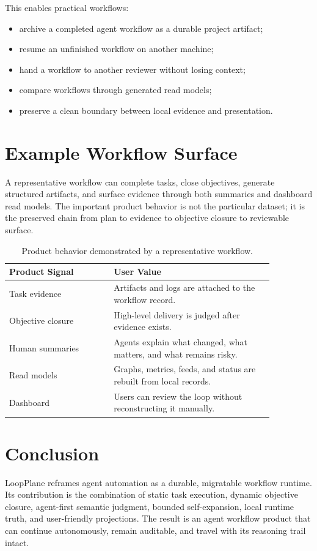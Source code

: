 \documentclass[11pt]{article}
\begin{document}
This enables practical workflows:

\begin{itemize}
\item archive a completed agent workflow as a durable project artifact;
\item resume an unfinished workflow on another machine;
\item hand a workflow to another reviewer without losing context;
\item compare workflows through generated read models;
\item preserve a clean boundary between local evidence and presentation.
\end{itemize}

\section{Example Workflow Surface}

A representative workflow can complete tasks, close objectives, generate
structured artifacts, and surface evidence through both summaries and dashboard
read models. The important product behavior is not the particular dataset; it
is the preserved chain from plan to evidence to objective closure to reviewable
surface.

\begin{table}[H]
\centering
\begin{tabular}{p{0.34\linewidth}p{0.52\linewidth}}
\toprule
Product Signal & User Value \\
\midrule
Task evidence & Artifacts and logs are attached to the workflow record. \\
Objective closure & High-level delivery is judged after evidence exists. \\
Human summaries & Agents explain what changed, what matters, and what remains risky. \\
Read models & Graphs, metrics, feeds, and status are rebuilt from local records. \\
Dashboard & Users can review the loop without reconstructing it manually. \\
\bottomrule
\end{tabular}
\caption{Product behavior demonstrated by a representative workflow.}
\end{table}

\section{Conclusion}

LoopPlane reframes agent automation as a durable, migratable workflow runtime.
Its contribution is the combination of static task execution, dynamic objective
closure, agent-first semantic judgment, bounded self-expansion, local runtime
truth, and user-friendly projections. The result is an agent workflow product
that can continue autonomously, remain auditable, and travel with its reasoning
trail intact.
\end{document}
